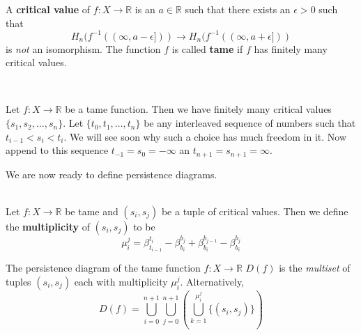 \begin{definition}
    A \textbf{critical value} of $f: X \to \mathbb{R}$ is an $a \in \mathbb{R}$ such that 
    there exists an $\epsilon > 0$ such that 
    \[
        H_n(f^{-1}((\infty, a - \epsilon])) \to H_n(f^{-1}((\infty, a +\epsilon ]))
    \]
    is \emph{not} an isomorphism. The function $f$ is called \textbf{tame} if 
    $f$ has finitely many critical values. 
\end{definition}\

Let $f: X \to \mathbb{R}$ be 
a tame function. Then we have finitely many critical values $\{s_1, s_2, \dots, s_n\}$.
Let $\{t_0, t_1, \dots, t_{n}\}$ be any interleaved sequence of numbers such that 
$t_{i-1} < s_i < t_{i}$. We will see soon why such a choice has much freedom in it. 
Now append to this sequence $t_{-1} = s_0 = -\infty$ an $t_{n+1} = s_{n+1} = \infty$. 

We are now ready to define persistence diagrams.
\\
\\
\begin{definition}
    Let $f: X \to \mathbb{R}$ be tame and 
    $(s_i, s_j)$ be a tuple of critical values. Then we define the \textbf{multiplicity} 
    of $(s_i, s_j)$ to be
    \[
        \mu_{i}^{j} = \beta_{t_{i-1}}^{t_i} -\beta_{b_i}^{b_j} + \beta_{b_{i}}^{b_{j-1}} - \beta_{b_i}^{b_j}
    \]
\end{definition}


\begin{definition}
    The persistence diagram of the tame function $f: X \to \mathbb{R}$ 
    $D(f)$ is the \emph{multiset} of tuples $(s_i, s_j)$ each with multiplicity $\mu_i^j$.
    Alternatively,
    \[
        D(f) = \bigcup_{i=0}^{n+1}\bigcup_{j = 0}^{n+1} \left( \bigcup_{k = 1}^{\mu_i^{j}} \{ (s_i, s_j) \}\right)
    \]
\end{definition}


